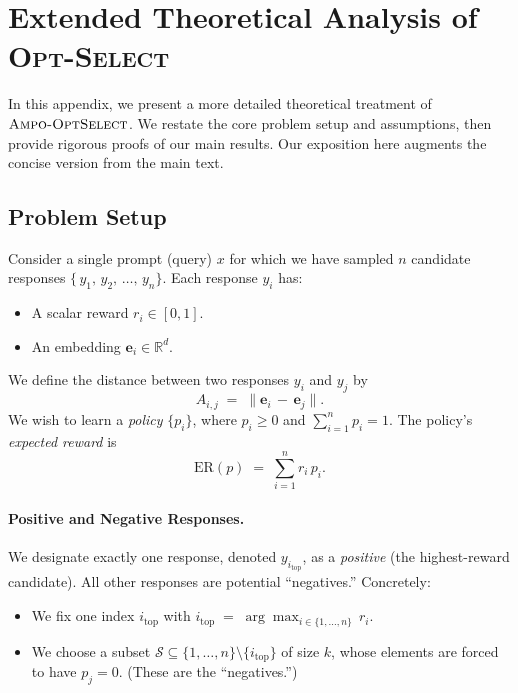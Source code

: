 \section{Extended Theoretical Analysis of \textsc{Opt-Select}}
\label{sec:theory_opt_select_extended}

In this appendix, we present a more detailed theoretical treatment of $\textsc{Ampo-OptSelect}$. We restate the core problem setup and assumptions, then provide rigorous proofs of our main results. Our exposition here augments the concise version from the main text.

\subsection{Problem Setup}

Consider a single prompt (query) \(x\) for which we have sampled \(n\) candidate responses \(\{\,y_1,\,y_2,\,\ldots,\,y_n\}\). Each response \(y_i\) has:
\begin{itemize}[itemsep=0.5em, leftmargin=1em]
    \item A scalar reward \(r_i \in [0,1]\).
    \item An embedding \(\mathbf{e}_i \in \mathbb{R}^d.\)
\end{itemize}
We define the distance between two responses \(y_i\) and \(y_j\) by
\begin{equation}
\label{eq:appdistdef}
A_{i,j} \;=\; \|\mathbf{e}_i \,-\, \mathbf{e}_j\|.
\end{equation}
We wish to learn a \emph{policy} \(\{p_i\}\), where \(p_i \ge 0\) and \(\sum_{i=1}^n p_i = 1\). The policy's \emph{expected reward} is
\begin{equation}
\label{eq:appexprew}
\mathrm{ER}(p) 
\;=\; 
\sum_{i=1}^n r_i \,p_i.
\end{equation}

\paragraph{Positive and Negative Responses.}
We designate exactly one response, denoted \(y_{i_{\mathrm{top}}}\), as a \emph{positive} (the highest-reward candidate). All other responses are potential ``negatives.'' Concretely:
\begin{itemize}[itemsep=0.5em, leftmargin=1em]
    \item We fix one index \(i_{\mathrm{top}}\) with \(\displaystyle i_{\mathrm{top}} \;=\; \arg \max_{i\in\{1,\dots,n\}}\,r_i.\)
    \item We choose a subset \(\mathcal{S}\subseteq \{1,\dots,n\}\setminus\{i_{\mathrm{top}}\}\) of size \(k\), whose elements are forced to have \(p_j=0\). (These are the ``negatives.'')
\end{itemize}

